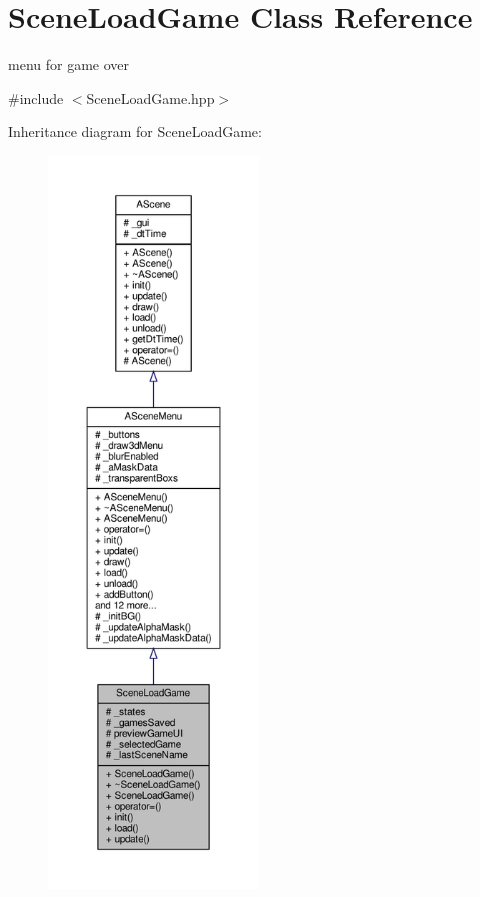 \hypertarget{class_scene_load_game}{}\section{Scene\+Load\+Game Class Reference}
\label{class_scene_load_game}


menu for game over  




{\ttfamily \#include $<$Scene\+Load\+Game.\+hpp$>$}



Inheritance diagram for Scene\+Load\+Game\+:
\nopagebreak
\begin{figure}[H]
\begin{center}
\leavevmode
\includegraphics[height=550pt]{class_scene_load_game__inherit__graph}
\end{center}
\end{figure}



